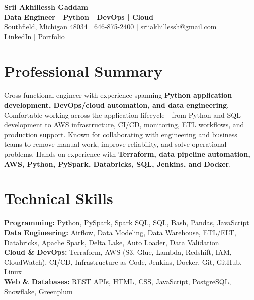 \documentclass[letterpaper,10pt]{article}
\begin{document}
\fontsize{9.35pt}{10.45pt}\selectfont

\begin{center}
    {\LARGE \textbf{Srii Akhillessh Gaddam}} \\[-1pt]
    \textbf{Data Engineer | Python | DevOps | Cloud} \\[2pt]
    Southfield, Michigan 48034 $|$
    \href{tel:6468752400}{646-875-2400} $|$
    \href{mailto:sriiakhillessh@gmail.com}{sriiakhillessh@gmail.com} \\[1pt]
    \href{https://www.linkedin.com/in/srii-akhiilessh-gaddam-b48668191/}{LinkedIn} $|$
    \href{https://sriiakhillesshg.github.io/portfolio/}{Portfolio}
\end{center}
\vspace{-8pt}

\section{Professional Summary}
\small{Cross-functional engineer with experience spanning \textbf{Python application development, DevOps/cloud automation, and data engineering}. Comfortable working across the application lifecycle - from Python and SQL development to AWS infrastructure, CI/CD, monitoring, ETL workflows, and production support. Known for collaborating with engineering and business teams to remove manual work, improve reliability, and solve operational problems. Hands-on experience with \textbf{Terraform, data pipeline automation, AWS, Python, PySpark, Databricks, SQL, Jenkins, and Docker}.}

\section{Technical Skills}
\small{
\textbf{Programming:} Python, PySpark, Spark SQL, SQL, Bash, Pandas, JavaScript \\
\textbf{Data Engineering:} Airflow, Data Modeling, Data Warehouse, ETL/ELT, Databricks, Apache Spark, Delta Lake, Auto Loader, Data Validation \\
\textbf{Cloud \& DevOps:} Terraform, AWS (S3, Glue, Lambda, Redshift, IAM, CloudWatch), CI/CD, Infrastructure as Code, Jenkins, Docker, Git, GitHub, Linux \\
\textbf{Web \& Databases:} REST APIs, HTML, CSS, JavaScript, PostgreSQL, Snowflake, Greenplum
}
\end{document}
